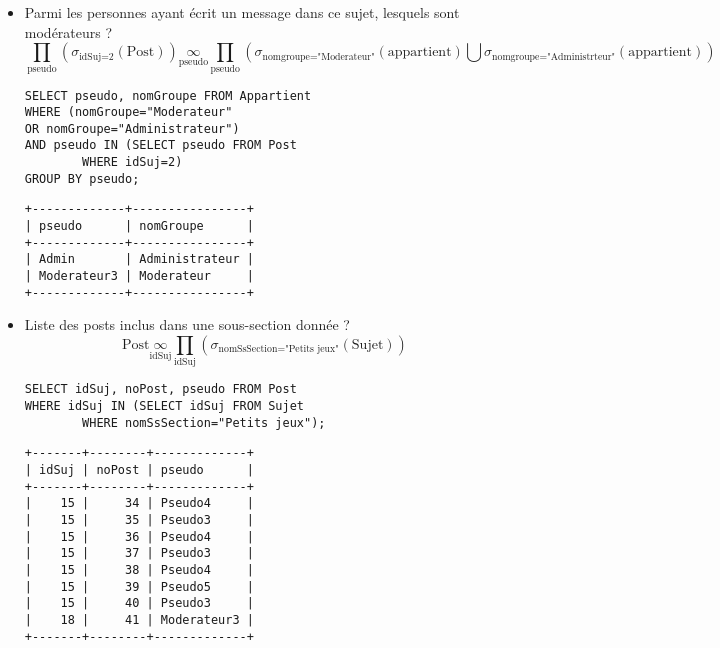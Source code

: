 \begin{itemize}
	\item Parmi les personnes ayant écrit un message dans ce sujet, lesquels sont modérateurs ?
	\[\prod_{\text{pseudo}}\left(\sigma_{\text{idSuj=2}}(\text{Post})\right)\underset{\text{pseudo}}{\infty} \prod_{\text{pseudo}}\left( \sigma_{\text{nomgroupe="Moderateur"}}(\text{appartient})\bigcup \sigma_{\text{nomgroupe="Administrteur"}}(\text{appartient})\right)\]
	\begin{verbatim}
SELECT pseudo, nomGroupe FROM Appartient
WHERE (nomGroupe="Moderateur"
OR nomGroupe="Administrateur")
AND pseudo IN (SELECT pseudo FROM Post
		WHERE idSuj=2)
GROUP BY pseudo;
	\end{verbatim}
\begin{verbatim}
+-------------+----------------+
| pseudo      | nomGroupe      |
+-------------+----------------+
| Admin       | Administrateur |
| Moderateur3 | Moderateur     |
+-------------+----------------+
\end{verbatim}

	\item Liste des posts inclus dans une sous-section donnée ?
	\[\text{Post}\underset{\text{idSuj}}{\infty}\prod_{\text{idSuj}}\left(\sigma_{\text{nomSsSection="Petits jeux"}}(\text{Sujet})\right)\]
	\begin{verbatim}
SELECT idSuj, noPost, pseudo FROM Post
WHERE idSuj IN (SELECT idSuj FROM Sujet
		WHERE nomSsSection="Petits jeux");
	\end{verbatim}

\begin{verbatim}
+-------+--------+-------------+
| idSuj | noPost | pseudo      |
+-------+--------+-------------+
|    15 |     34 | Pseudo4     |
|    15 |     35 | Pseudo3     |
|    15 |     36 | Pseudo4     |
|    15 |     37 | Pseudo3     |
|    15 |     38 | Pseudo4     |
|    15 |     39 | Pseudo5     |
|    15 |     40 | Pseudo3     |
|    18 |     41 | Moderateur3 |
+-------+--------+-------------+
\end{verbatim}
\end{itemize}
